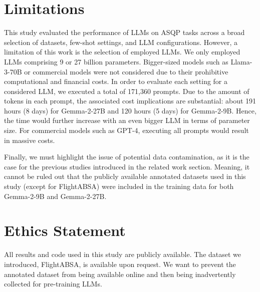 \section*{Limitations}

This study evaluated the performance of LLMs on ASQP tasks across a broad selection of datasets, few-shot settings, and LLM configurations. However, a limitation of this work is the selection of employed LLMs. We only employed LLMs comprising 9 or 27 billion parameters. Bigger-sized models such as Llama-3-70B \citep{dubey2024llama} or commercial models were not considered due to their prohibitive computational and financial costs. In order to evaluate each setting for a considered LLM, we executed a total of 171,360 prompts. Due to the amount of tokens in each prompt, the associated cost implications are substantial: about 191 hours (8 days) for Gemma-2-27B and 120 hours (5 days) for Gemma-2-9B. Hence, the time would further increase with an even bigger LLM in terms of parameter size. For commercial models such as GPT-4, executing all prompts would result in massive costs.

Finally, we must highlight the issue of potential data contamination, as it is the case for the previous studies introduced in the related work section. Meaning, it cannot be ruled out that the publicly available annotated datasets used in this study (except for FlightABSA) were included in the training data for both Gemma-2-9B and Gemma-2-27B.

\section*{Ethics Statement}

All results and code used in this study are publicly available. The dataset we introduced, FlightABSA, is available upon request. We want to prevent the annotated dataset from being available online and then being inadvertently collected for pre-training LLMs.